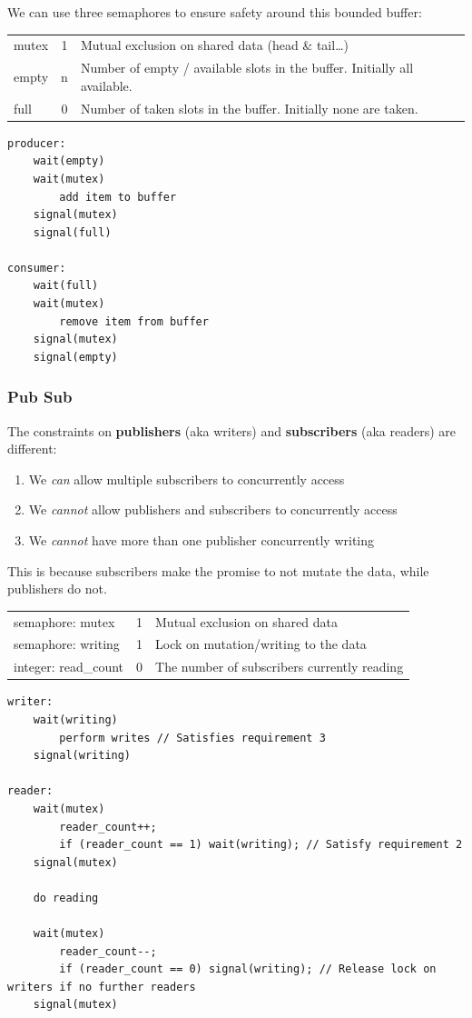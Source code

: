 \documentclass[a4]{article}
\begin{document}
We can use three semaphores to ensure safety around this bounded buffer:

\begin{tabular}{l | c | l }
mutex & 1 & Mutual exclusion on shared data (head \& tail\ldots{})\\
empty & n & Number of empty / available slots in the buffer. Initially all available.\\
full  & 0 & Number of taken slots in the buffer. Initially none are taken.
\end{tabular}

\begin{verbatim}
producer:
    wait(empty)
    wait(mutex)
        add item to buffer
    signal(mutex)
    signal(full)

consumer:
    wait(full)
    wait(mutex)
        remove item from buffer
    signal(mutex)
    signal(empty)
\end{verbatim}

\subsubsection{Pub Sub}\label{pub-sub}

The constraints on \textbf{publishers} (aka writers) and
\textbf{subscribers} (aka readers) are different:

\begin{enumerate}
\item
  We \emph{can} allow multiple subscribers to concurrently access
\item
  We \emph{cannot} allow publishers and subscribers to concurrently
  access
\item
  We \emph{cannot} have more than one publisher concurrently writing
\end{enumerate}

This is because subscribers make the promise to not mutate the data,
while publishers do not.

\begin{tabular}{l | c | l }
semaphore: mutex     & 1 & Mutual exclusion on shared data\\
semaphore: writing   & 1 & Lock on mutation/writing to the data\\
integer: read\_count & 0 & The number of subscribers currently reading
\end{tabular}

\begin{verbatim}
writer:
    wait(writing)
        perform writes // Satisfies requirement 3
    signal(writing)
    
reader:
    wait(mutex)
        reader_count++;
        if (reader_count == 1) wait(writing); // Satisfy requirement 2
    signal(mutex)
    
    do reading
    
    wait(mutex)
        reader_count--;
        if (reader_count == 0) signal(writing); // Release lock on writers if no further readers
    signal(mutex)
\end{verbatim}
\end{document}
